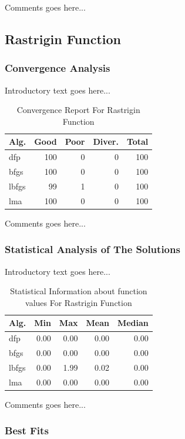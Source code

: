 \documentclass{ieeeaccess}
\begin{document}
Comments goes here...
\subsection{Rastrigin Function}
\label{rastrigin2d2D}

\subsubsection{Convergence Analysis}
\label{convergencerastrigin2d2D}


Introductory text goes here...
\begin{table}
\centering
\caption{Convergence Report For Rastrigin Function}
\label{convergence:rastrigin2d}
\begin{tabular}{lrrrr}
\toprule
 Alg. &  Good &  Poor &  Diver. &  Total \\
\midrule
  dfp &   100 &     0 &       0 &    100 \\
 bfgs &   100 &     0 &       0 &    100 \\
lbfgs &    99 &     1 &       0 &    100 \\
  lma &   100 &     0 &       0 &    100 \\
\bottomrule
\end{tabular}
\end{table}


Comments goes here...
\subsubsection{Statistical Analysis of The Solutions}
\label{statisticalanalysisrastrigin2d2D}


Introductory text goes here...
\begin{table}
\centering
\caption{Statistical Information about function values For Rastrigin Function}
\label{function_values:rastrigin2d}
\begin{tabular}{lrrrr}
\toprule
 Alg. &  Min &  Max &  Mean &  Median \\
\midrule
  dfp & 0.00 & 0.00 &  0.00 &    0.00 \\
 bfgs & 0.00 & 0.00 &  0.00 &    0.00 \\
lbfgs & 0.00 & 1.99 &  0.02 &    0.00 \\
  lma & 0.00 & 0.00 &  0.00 &    0.00 \\
\bottomrule
\end{tabular}
\end{table}


Comments goes here...
\subsubsection{Best Fits}
\label{bestfitsrastrigin2d2D}
\end{document}
